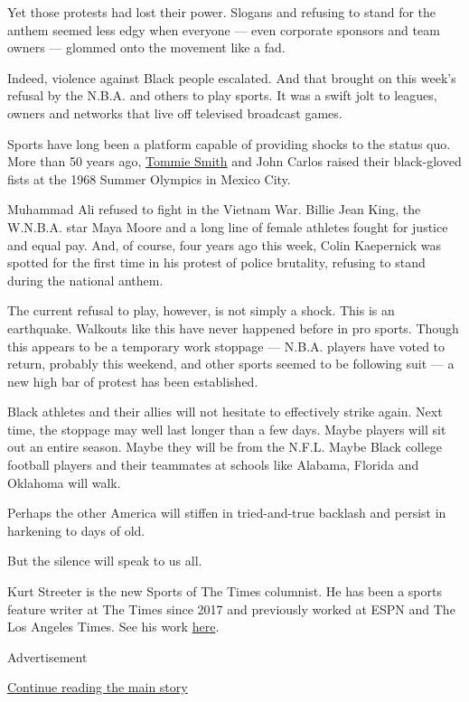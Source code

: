 Yet those protests had lost their power. Slogans and refusing to stand
for the anthem seemed less edgy when everyone --- even corporate
sponsors and team owners --- glommed onto the movement like a fad.

Indeed, violence against Black people escalated. And that brought on
this week's refusal by the N.B.A. and others to play sports. It was a
swift jolt to leagues, owners and networks that live off televised
broadcast games.

Sports have long been a platform capable of providing shocks to the
status quo. More than 50 years ago,
\href{https://www.nytimes3xbfgragh.onion/2020/06/13/sports/tommie-smith-protest-colin-kaepernick.html}{Tommie
Smith} and John Carlos raised their black-gloved fists at the 1968
Summer Olympics in Mexico City.

Muhammad Ali refused to fight in the Vietnam War. Billie Jean King, the
W.N.B.A. star Maya Moore and a long line of female athletes fought for
justice and equal pay. And, of course, four years ago this week, Colin
Kaepernick was spotted for the first time in his protest of police
brutality, refusing to stand during the national anthem.

The current refusal to play, however, is not simply a shock. This is an
earthquake. Walkouts like this have never happened before in pro sports.
Though this appears to be a temporary work stoppage --- N.B.A. players
have voted to return, probably this weekend, and other sports seemed to
be following suit --- a new high bar of protest has been established.

Black athletes and their allies will not hesitate to effectively strike
again. Next time, the stoppage may well last longer than a few days.
Maybe players will sit out an entire season. Maybe they will be from the
N.F.L. Maybe Black college football players and their teammates at
schools like Alabama, Florida and Oklahoma will walk.

Perhaps the other America will stiffen in tried-and-true backlash and
persist in harkening to days of old.

But the silence will speak to us all.

Kurt Streeter is the new Sports of The Times columnist. He has been a
sports feature writer at The Times since 2017 and previously worked at
ESPN and The Los Angeles Times. See his work
\href{https://www.nytimes3xbfgragh.onion/by/kurt-streeter}{here}.

Advertisement

\protect\hyperlink{after-bottom}{Continue reading the main story}


